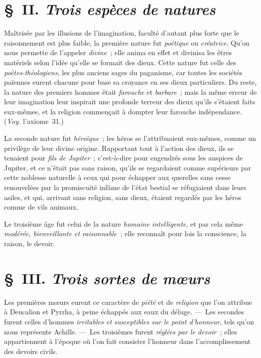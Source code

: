 \documentclass[french,twoside]{book} %
\begin{document}
\section[{§ II. Trois espèces de natures}]{§ II. {\itshape Trois espèces de natures}}
\noindent Maîtrisée par les illusions de l’imagination, faculté d’autant plus forte que le raisonnement est plus faible, la première nature fut {\itshape poétique} ou {\itshape créatrice}. Qu’on nous permette de l’appeler {\itshape divine} ; elle anima en effet et divinisa les êtres matériels selon  l’idée qu’elle se formait des dieux. Cette nature fut celle des {\itshape poètes-théologiens}, les plus anciens sages du paganisme, car toutes les sociétés païennes eurent chacune pour base sa croyance en ses dieux particuliers. Du reste, la nature des premiers hommes était {\itshape farouche} et {\itshape barbare} ; mais la même erreur de leur imagination leur inspirait une profonde terreur des dieux qu’ils s’étaient faits eux-mêmes, et la religion commençait à dompter leur farouche indépendance. ({\itshape Voy.} l’axiome 31.)\par
La seconde nature fut {\itshape héroïque} ; les héros se l’attribuaient eux-mêmes, comme un privilège de leur divine origine. Rapportant tout à l’action des dieux, ils se tenaient pour {\itshape fils de Jupiter} ; c’est-à-dire pour engendrés sous les auspices de Jupiter, et ce n’était pas sans raison, qu’ils se regardaient comme supérieurs par cette noblesse naturelle à ceux qui pour échapper aux querelles sans cesse renouvelées par la promiscuité infâme de l’état bestial se réfugiaient dans leurs asiles, et qui, arrivant sans religion, sans dieux, étaient regardés par les héros comme de vils animaux.\par
Le troisième âge fut celui de la nature {\itshape humaine intelligente}, et par cela même {\itshape modérée, bienveillante et raisonnable} ; elle reconnaît pour lois la conscience, la raison, le devoir.
\section[{§ III. Trois sortes de mœurs}]{§ III. {\itshape Trois sortes de mœurs}}
\noindent Les premières mœurs eurent ce caractère de {\itshape piété} et de {\itshape religion} que l’on attribue à Deucalion et Pyrrha,  à peine échappés aux eaux du déluge. — Les secondes furent celles d’hommes {\itshape irritables et susceptibles sur le point d’honneur}, tels qu’on nous représente Achille. — Les troisièmes furent {\itshape réglées par le devoir} ; elles appartiennent à l’époque où l’on fait consister l’honneur dans l’accomplissement des devoirs civils.
\end{document}
